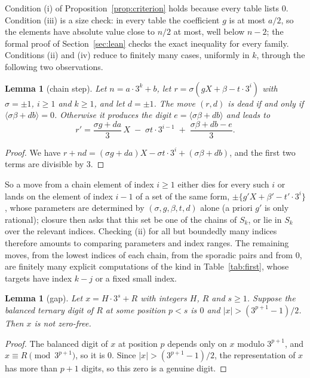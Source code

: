 \documentclass[11pt]{amsart}
\newtheorem{lemma}[theorem]{Lemma}
\theoremstyle{definition}
\newcommand{\bal}[1]{\langle #1\rangle}
\begin{document}
Condition (i) of Proposition~\ref{prop:criterion} holds because every table lists $0$. Condition (iii) is a size check: in every table the coefficient $g$ is at most $a/2$, so the elements have absolute value close to $n/2$ at most, well below $n-2$; the formal proof of Section~\ref{sec:lean} checks the exact inequality for every family. Conditions
(ii) and (iv) reduce to finitely many cases, uniformly in $k$, through the following two observations.

\begin{lemma}[chain step]\label{lem:chain}
Let $n=a\cdot 3^k+b$, let $r=\sigma(gX+\beta-t\cdot 3^i)$ with $\sigma=\pm1$, $i\ge 1$ and $k\ge 1$,
and let $d=\pm 1$. The move $(r,d)$ is dead if and only if $\bal{\sigma\beta+db}=0$. Otherwise it
produces the digit $e=\bal{\sigma\beta+db}$ and leads to
\[
r'=\frac{\sigma g+da}{3}\,X\;-\;\sigma t\cdot 3^{i-1}\;+\;\frac{\sigma\beta+db-e}{3}.
\]
\end{lemma}

\begin{proof}
We have $r+nd=(\sigma g+da)X-\sigma t\cdot 3^i+(\sigma\beta+db)$, and the first two terms are
divisible by $3$.
\end{proof}

So a move from a chain element of index $i\ge 1$ either dies for every such $i$ or lands on the
element of index $i-1$ of a set of the same form, $\pm\{g'X+\beta'-t'\cdot 3^{i}\}$, whose parameters
are determined by $(\sigma,g,\beta,t,d)$ alone (a priori $g'$ is only rational); closure then asks
that this set be one of the chains of $S_k$, or lie in $S_k$ over the relevant indices. Checking (ii) for
all but boundedly many indices therefore amounts to comparing parameters and index ranges. The
remaining moves, from the lowest indices of each chain, from the sporadic pairs and from $0$, are
finitely many explicit computations of the kind in Table~\ref{tab:first}, whose targets have index
$k-j$ or a fixed small index.

\begin{lemma}[gap]\label{lem:gap}
Let $x=H\cdot 3^s+R$ with integers $H$, $R$ and $s\ge 1$. Suppose the balanced ternary digit of
$R$ at some position $p<s$ is $0$ and $|x|>(3^{p+1}-1)/2$. Then $x$ is not zero-free.
\end{lemma}

\begin{proof}
The balanced digit of $x$ at position $p$ depends only on $x$ modulo $3^{p+1}$, and
$x\equiv R\pmod{3^{p+1}}$, so it is $0$. Since $|x|>(3^{p+1}-1)/2$, the representation of $x$ has more
than $p+1$ digits, so this zero is a genuine digit.
\end{proof}
\end{document}
